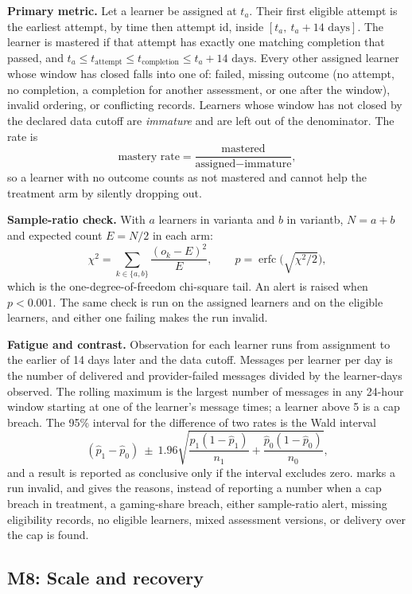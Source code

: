 \documentclass[11pt,a4paper]{article}
\renewcommand{\_}{\textunderscore\allowbreak{}}
\begin{document}
\textbf{Primary metric.} Let a learner be assigned at $t_a$. Their first eligible attempt is the earliest attempt, by time then attempt id, inside $[t_a,\ t_a+14\text{ days}]$. The learner is mastered if that attempt has exactly one matching completion that passed, and $t_a \le t_{\text{attempt}} \le t_{\text{completion}} \le t_a + 14\text{ days}$. Every other assigned learner whose window has closed falls into one of: failed, missing outcome (no attempt, no completion, a completion for another assessment, or one after the window), invalid ordering, or conflicting records. Learners whose window has not closed by the declared data cutoff are \emph{immature} and are left out of the denominator. The rate is
\[
\text{mastery rate}=\frac{\text{mastered}}{\text{assigned}-\text{immature}},
\]
so a learner with no outcome counts as not mastered and cannot help the treatment arm by silently dropping out.

\textbf{Sample-ratio check.} With $a$ learners in variant\_a and $b$ in variant\_b, $N=a+b$ and expected count $E=N/2$ in each arm:
\[
\chi^2=\sum_{k\in\{a,b\}}\frac{(o_k-E)^2}{E},\qquad p=\operatorname{erfc}\!\Big(\sqrt{\chi^2/2}\Big),
\]
which is the one-degree-of-freedom chi-square tail. An alert is raised when $p<0.001$. The same check is run on the assigned learners and on the eligible learners, and either one failing makes the run invalid.

\textbf{Fatigue and contrast.} Observation for each learner runs from assignment to the earlier of 14 days later and the data cutoff. Messages per learner per day is the number of delivered and provider-failed messages divided by the learner-days observed. The rolling maximum is the largest number of messages in any 24-hour window starting at one of the learner's message times; a learner above 5 is a cap breach. The 95\% interval for the difference of two rates is the Wald interval
\[
(\hat p_1-\hat p_0)\ \pm\ 1.96\sqrt{\frac{\hat p_1(1-\hat p_1)}{n_1}+\frac{\hat p_0(1-\hat p_0)}{n_0}},
\]
and a result is reported as conclusive only if the interval excludes zero.  marks a run invalid, and gives the reasons, instead of reporting a number when a cap breach in treatment, a gaming-share breach, either sample-ratio alert, missing eligibility records, no eligible learners, mixed assessment versions, or delivery over the cap is found.

\subsection{M8: Scale and recovery}
\end{document}
